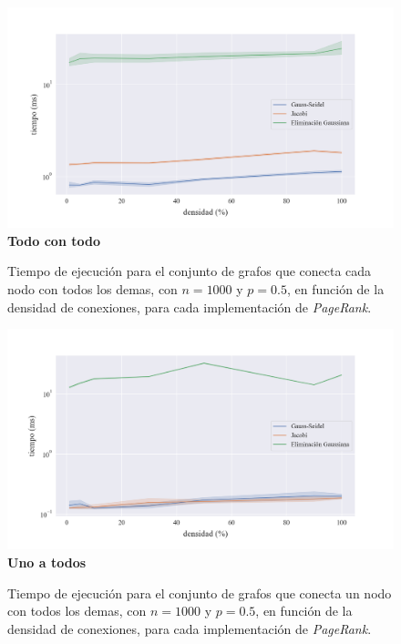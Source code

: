 \begin{figure}[!htbp]
    \centering
    \includegraphics[width=1\textwidth, trim=0 0 0 30]{files/src/.media/densidad_todo_con_todo.png}
    \textbf{Todo con todo}\par
    \caption{Tiempo de ejecución para el conjunto de grafos que conecta cada nodo con todos los demas, con $n = 1000$ y $p = 0.5$, en función de la densidad de conexiones, para cada implementación de \textit{PageRank}.}
    \label{densidad_todo_con_todo}
\end{figure}

\begin{figure}[!htbp]
    \centering
    \includegraphics[width=1\textwidth, trim=0 0 0 30]{files/src/.media/densidad_uno_a_todos.png}
    \textbf{Uno a todos}\par
    \caption{Tiempo de ejecución para el conjunto de grafos que conecta un nodo con todos los demas, con $n = 1000$ y $p = 0.5$, en función de la densidad de conexiones, para cada implementación de \textit{PageRank}.}
    \label{densidad_uno_a_todos}
\end{figure}


